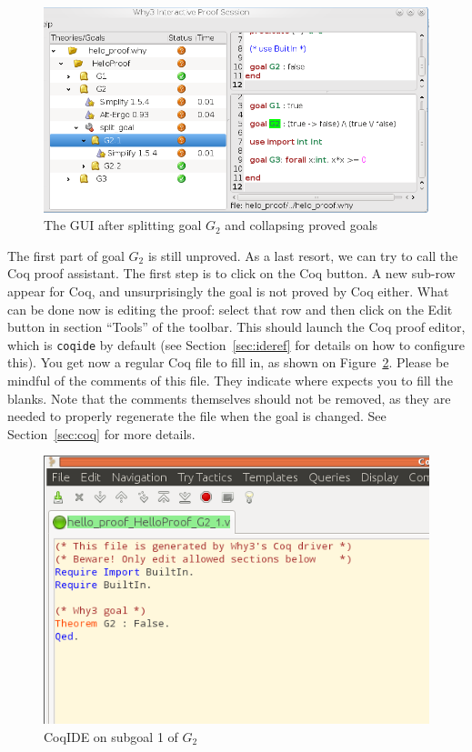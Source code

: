 \begin{figure}[tbp]
 \includegraphics[width=\textwidth]{gui-0-70-4.png}
  \caption{The GUI after splitting goal $G_2$ and collapsing proved goals}
  \label{fig:gui4}
\end{figure}

The first part of goal $G_2$ is still unproved. As a last resort, we
can try to call the Coq proof assistant. The first step is to click on
the \textsf{Coq} button. A new sub-row appear for Coq, and
unsurprisingly the goal is not proved by Coq either. What can be done
now is editing the proof: select that row and then click on the
\textsf{Edit} button in section ``Tools'' of the toolbar. This should
launch the Coq proof editor, which is \texttt{coqide} by default (see
Section~\ref{sec:ideref} for details on how to configure this). You get
now a regular Coq file to fill in, as shown on Figure~\ref{fig:coqide}.
Please be mindful of the comments of this file. They indicate where \why
expects you to fill the blanks. Note that the comments themselves should
not be removed, as they are needed to properly regenerate the file when the
goal is changed. See Section~\ref{sec:coq} for more details.

\begin{figure}[tbp]
  \includegraphics[width=\textwidth]{coqide-0-81.png}
  \caption{CoqIDE on subgoal 1 of $G_2$}
  \label{fig:coqide}
\end{figure}

